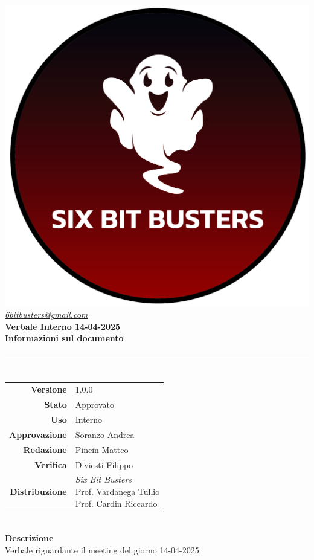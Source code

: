 \thispagestyle{empty}
\renewcommand{\arraystretch}{1.3}


\begin{titlepage}
	\begin{center}
		
	\includegraphics[scale = 0.7]{template/images/logo-circle.png}
	\\[1cm]
	\href{mailto:6bitbusters@gmail.com}		      	
	{\large{\textit{6bitbusters@gmail.com} } }\\[1cm]
	
	\Huge \textbf{Verbale Interno 14-04-2025} \\[1cm]

	\large \textbf{Informazioni sul documento} \\
	\rule{0.6\textwidth}{0.4pt}
	\\[0.5cm]
	\begin{tabular}{r|l}
		\textbf{Versione} & 1.0.0\\
		\textbf{Stato} & Approvato\\
		\textbf{Uso} & Interno\\                         
		\textbf{Approvazione} & Soranzo Andrea\\                      
		\textbf{Redazione} & Pincin Matteo\\ 
		\textbf{Verifica} & Diviesti Filippo\\                         
		\textbf{Distribuzione} & \parbox[t]{5cm}{ \textit{Six Bit Busters} \\ Prof. Vardanega Tullio 
	 \\ Prof. Cardin Riccardo}
	\end{tabular}	
	\\[1.2cm]

	\large \textbf{Descrizione} \\
	Verbale riguardante il meeting del giorno 14-04-2025 
	
	\end{center}
\end{titlepage}
